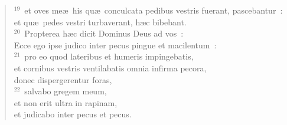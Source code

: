 \begin{verse}
${}^{19}$~et oves me\ae\ his qu\ae\ conculcata pedibus vestris fuerant, pascebantur~:\\ et qu\ae\ pedes vestri turbaverant, h\ae c bibebant.\\
${}^{20}$~Propterea h\ae c dicit Dominus Deus ad vos~:\\ Ecce ego ipse judico inter pecus pingue et macilentum~:\\
${}^{21}$~pro eo quod lateribus et humeris impingebatis,\\ et cornibus vestris ventilabatis omnia infirma pecora,\\ donec dispergerentur foras,\\
${}^{22}$~salvabo gregem meum,\\ et non erit ultra in rapinam,\\ et judicabo inter pecus et pecus.\end{verse}


